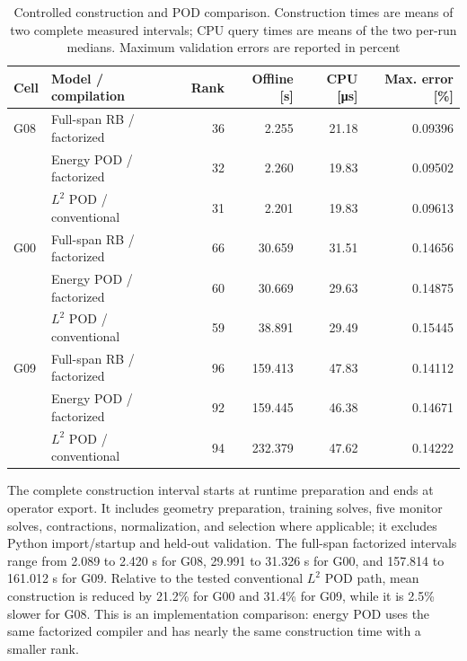 \documentclass[pdflatex,sn-basic,Numbered]{sn-jnl}
\begin{document}
\begin{table}[t]
\centering
\caption{Controlled construction and POD comparison. Construction times are
means of two complete measured intervals; CPU query times are means of the
two per-run medians. Maximum validation errors are reported in percent}
\label{tab:computational_performance}
\small
\setlength{\tabcolsep}{4pt}
\begin{tabular}{@{}llrrrr@{}}
\toprule
Cell & Model / compilation & Rank & Offline [s] & CPU [\si{\micro\second}] & Max. error [\%] \\
\midrule
G08 & Full-span RB / factorized & 36 & 2.255 & 21.18 & 0.09396 \\
    & Energy POD / factorized & 32 & 2.260 & 19.83 & 0.09502 \\
    & \(L^2\) POD / conventional & 31 & 2.201 & 19.83 & 0.09613 \\
G00 & Full-span RB / factorized & 66 & 30.659 & 31.51 & 0.14656 \\
    & Energy POD / factorized & 60 & 30.669 & 29.63 & 0.14875 \\
    & \(L^2\) POD / conventional & 59 & 38.891 & 29.49 & 0.15445 \\
G09 & Full-span RB / factorized & 96 & 159.413 & 47.83 & 0.14112 \\
    & Energy POD / factorized & 92 & 159.445 & 46.38 & 0.14671 \\
    & \(L^2\) POD / conventional & 94 & 232.379 & 47.62 & 0.14222 \\
\bottomrule
\end{tabular}
\end{table}

The complete construction interval starts at runtime preparation and ends at
operator export. It includes geometry preparation, training solves, five
monitor solves, contractions, normalization, and selection where applicable;
it excludes Python import/startup and held-out validation. The full-span
factorized intervals range from 2.089 to 2.420 s for G08, 29.991 to
31.326 s for G00, and 157.814 to 161.012 s for G09. Relative to the tested
conventional \(L^2\) POD path, mean construction is reduced by 21.2\% for
G00 and 31.4\% for G09, while it is 2.5\% slower for G08. This is an
implementation comparison: energy POD uses the same factorized compiler and
has nearly the same construction time with a smaller rank.
\end{document}
